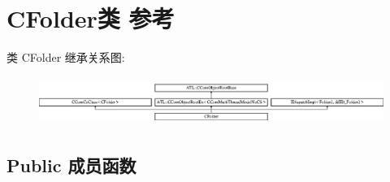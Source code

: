\hypertarget{class_c_folder}{}\section{C\+Folder类 参考}
\label{class_c_folder}
类 C\+Folder 继承关系图\+:\begin{figure}[H]
\begin{center}
\leavevmode
\includegraphics[height=1.590909cm]{class_c_folder}
\end{center}
\end{figure}
\subsection*{Public 成员函数}
